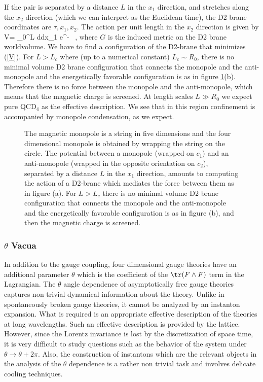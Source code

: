 If the pair is separated by a distance $L$ in the $x_1$ direction,
and stretches along the $x_2$ direction (which we can interpret as the
Euclidean time), the D2 brane coordinates are
${\tau,x_1, x_2}$. 
The action per unit length in the $x_2$ direction is given by 
\beq
V= \int_0^L d\tau dx_1 e^{-\phi} 
 \ ,
\label{V}
\eeq
where $G$ is the induced metric on the D2 brane worldvolume.
We have to find a configuration of the D2-brane that minimizes (\ref{V}).
For $L > L_c$ where (up to a numerical constant) $L_c \sim R_0$,
there is no minimal volume D2 brane configuration that connects
the monopole and the anti-monopole and the energetically favorable
configuration is as in figure \ref{Monopole}(b).
Therefore there is no force between the monopole and the anti-monopole, which 
means that the magnetic charge is screened.
At length scales $L \gg R_0$ 
we expect pure QCD$_4$ as the effective description.
We see that in this region confinement is accompanied by 
monopole condensation, as we expect.   


\begin{figure}[htb]
\begin{center}
\epsfxsize=3in\leavevmode{}
\end{center}
\caption{The magnetic monopole is a string in five dimensions and
the four dimensional monopole is obtained by wrapping
the string on the circle. 
The potential between a monopole (wrapped on $c_1$) and an anti-monopole
(wrapped in the opposite orientation on $c_2$),
separated by a distance $L$ in the $x_1$ direction,
amounts to computing the action of a D2-brane which 
mediates the force between them
as in figure (a). 
For $L > L_c$ 
there is no minimal volume D2 brane configuration that connects
the monopole and the anti-monopole and the energetically favorable
configuration is as in figure (b), and then
the magnetic charge is screened.
}
\label{Monopole}
\end{figure} 


\subsubsection{$\theta$ Vacua}

In addition to the gauge coupling, four dimensional gauge theories
have an additional parameter $\theta$ which is the coefficient of the
$\tr(F\wedge F)$ term in the Lagrangian.  The $\theta$ angle
dependence of asymptotically free gauge theories captures non trivial
dynamical information about the theory.  Unlike in spontaneously broken
gauge theories, it cannot be analyzed by an instanton expansion.  What
is required is an appropriate effective description of the theories at
long wavelengths.  Such an effective description is provided by the
lattice.  However, since the Lorentz invariance is lost by the
discretization of space time, it is very difficult to study questions
such as the behavior of the system under $\theta \rightarrow \theta +
2\pi$.  Also, the construction of instantons which are the relevant
objects in the analysis of the $\theta$ dependence is a rather non
trivial task and involves delicate cooling techniques.


